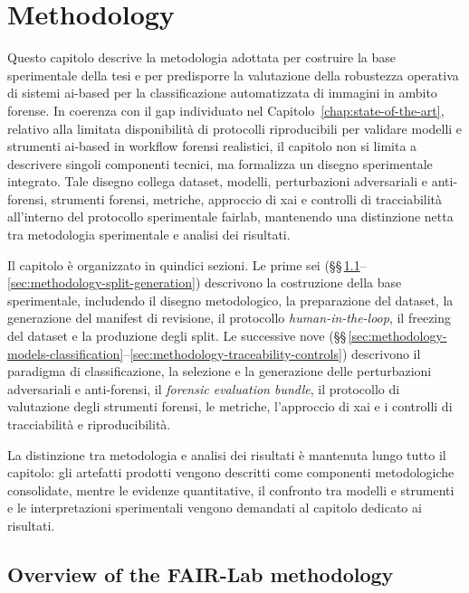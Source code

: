 \chapter{Methodology}
\label{chap:methodology}

Questo capitolo descrive la metodologia adottata per costruire la base
sperimentale della tesi e per predisporre la valutazione della robustezza
operativa di sistemi \gls{ai}-based per la classificazione automatizzata
di immagini in ambito forense. In coerenza con il gap individuato nel
Capitolo~\ref{chap:state-of-the-art}, relativo alla limitata disponibilità
di protocolli riproducibili per validare modelli e strumenti \gls{ai}-based
in workflow forensi realistici, il capitolo non si limita a descrivere
singoli componenti tecnici, ma formalizza un disegno sperimentale integrato.
Tale disegno collega dataset, modelli, perturbazioni adversariali e
anti-forensi, strumenti forensi, metriche, approccio di \gls{xai} e controlli
di tracciabilità all'interno del protocollo sperimentale \gls{fairlab},
mantenendo una distinzione netta tra metodologia sperimentale e analisi dei
risultati.

Il capitolo è organizzato in quindici sezioni. Le prime sei
(\S\S\,\ref{sec:methodology-fairlab-overview}--\ref{sec:methodology-split-generation})
descrivono la costruzione della base sperimentale, includendo il disegno
metodologico, la preparazione del dataset, la generazione del manifest di
revisione, il protocollo \textit{human-in-the-loop}, il freezing del dataset e
la produzione degli split. Le successive nove
(\S\S\,\ref{sec:methodology-models-classification}--\ref{sec:methodology-traceability-controls})
descrivono il paradigma di classificazione, la selezione e la generazione
delle perturbazioni adversariali e anti-forensi, il \textit{forensic evaluation
bundle}, il protocollo di valutazione degli strumenti forensi, le metriche,
l'approccio di \gls{xai} e i controlli di tracciabilità e riproducibilità.

La distinzione tra metodologia e analisi dei risultati è mantenuta lungo tutto
il capitolo: gli artefatti prodotti vengono descritti come componenti
metodologiche consolidate, mentre le evidenze quantitative, il confronto tra
modelli e strumenti e le interpretazioni sperimentali vengono demandati al
capitolo dedicato ai risultati.


\section{Overview of the FAIR-Lab methodology}
\label{sec:methodology-fairlab-overview}

